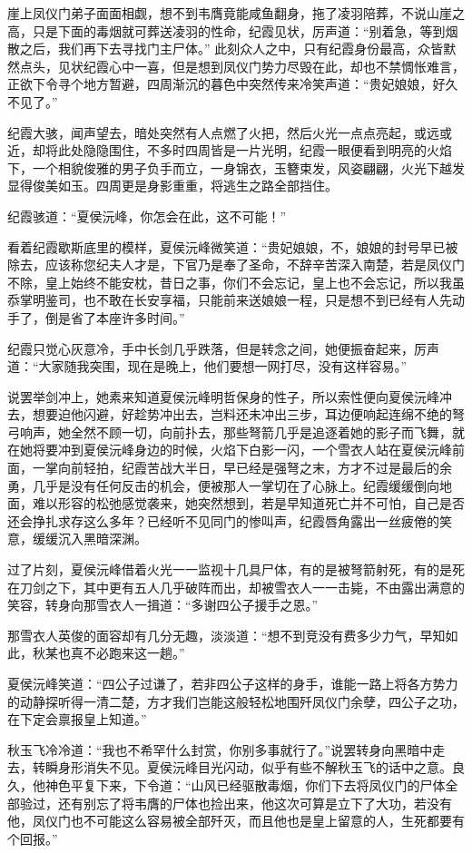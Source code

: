 崖上凤仪门弟子面面相觑，想不到韦膺竟能咸鱼翻身，拖了凌羽陪葬，不说山崖之高，只是下面的毒烟就可葬送凌羽的性命，纪霞见状，厉声道：“别着急，等到烟散之后，我们再下去寻找门主尸体。” 此刻众人之中，只有纪霞身份最高，众皆默然点头，见状纪霞心中一喜，但是想到凤仪门势力尽毁在此，却也不禁惆怅难言，正欲下令寻个地方暂避，四周渐沉的暮色中突然传来冷笑声道：“贵妃娘娘，好久不见了。”

纪霞大骇，闻声望去，暗处突然有人点燃了火把，然后火光一点点亮起，或远或近，却将此处隐隐围住，不多时四周皆是一片光明，纪霞一眼便看到明亮的火焰下，一个相貌俊雅的男子负手而立，一身锦衣，玉簪束发，风姿翩翩，火光下越发显得俊美如玉。四周更是身影重重，将逃生之路全部挡住。

纪霞骇道：“夏侯沅峰，你怎会在此，这不可能！”

看着纪霞歇斯底里的模样，夏侯沅峰微笑道：“贵妃娘娘，不，娘娘的封号早已被除去，应该称您纪夫人才是，下官乃是奉了圣命，不辞辛苦深入南楚，若是凤仪门不除，皇上始终不能安枕，昔日之事，你们不会忘记，皇上也不会忘记，所以我虽忝掌明鉴司，也不敢在长安享福，只能前来送娘娘一程，只是想不到已经有人先动手了，倒是省了本座许多时间。”

纪霞只觉心灰意冷，手中长剑几乎跌落，但是转念之间，她便振奋起来，厉声道：“大家随我突围，现在是晚上，他们要想一网打尽，没有这样容易。”

说罢举剑冲上，她素来知道夏侯沅峰明哲保身的性子，所以索性便向夏侯沅峰冲去，想要迫他闪避，好趁势冲出去，岂料还未冲出三步，耳边便响起连绵不绝的弩弓响声，她全然不顾一切，向前扑去，那些弩箭几乎是追逐着她的影子而飞舞，就在她将要冲到夏侯沅峰身边的时候，火焰下白影一闪，一个雪衣人站在夏侯沅峰前面，一掌向前轻拍，纪霞苦战大半日，早已经是强弩之末，方才不过是最后的余勇，几乎是没有任何反击的机会，便被那人一掌切在了心脉上。纪霞缓缓倒向地面，难以形容的松弛感觉袭来，她突然想到，若是早知道死亡并不可怕，自己是否还会挣扎求存这么多年？已经听不见同门的惨叫声，纪霞唇角露出一丝疲倦的笑意，缓缓沉入黑暗深渊。

过了片刻，夏侯沅峰借着火光一一监视十几具尸体，有的是被弩箭射死，有的是死在刀剑之下，其中更有五人几乎破阵而出，却被雪衣人一一击毙，不由露出满意的笑容，转身向那雪衣人一揖道：“多谢四公子援手之恩。”

那雪衣人英俊的面容却有几分无趣，淡淡道：“想不到竞没有费多少力气，早知如此，秋某也真不必跑来这一趟。”

夏侯沅峰笑道：“四公子过谦了，若非四公子这样的身手，谁能一路上将各方势力的动静探听得一清二楚，方才我们岂能这般轻松地围歼凤仪门余孽，四公子之功，在下定会禀报皇上知道。”

秋玉飞冷冷道：“我也不希罕什么封赏，你别多事就行了。”说罢转身向黑暗中走去，转瞬身形消失不见。夏侯沅峰目光闪动，似乎有些不解秋玉飞的话中之意。良久，他神色平复下来，下令道：“山风已经驱散毒烟，你们下去将凤仪门的尸体全部验过，还有别忘了将韦膺的尸体也捡出来，他这次可算是立下了大功，若没有他，凤仪门也不可能这么容易被全部歼灭，而且他也是皇上留意的人，生死都要有个回报。”

